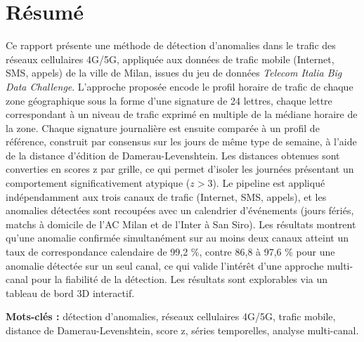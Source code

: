 \chapter*{Résumé}

Ce rapport présente une méthode de détection d'anomalies dans le trafic
des réseaux cellulaires 4G/5G, appliquée aux données de trafic mobile
(Internet, SMS, appels) de la ville de Milan, issues du jeu de données
\emph{Telecom Italia Big Data Challenge}. L'approche proposée encode le
profil horaire de trafic de chaque zone géographique sous la forme
d'une signature de 24 lettres, chaque lettre correspondant à un niveau
de trafic exprimé en multiple de la médiane horaire de la zone. Chaque
signature journalière est ensuite comparée à un profil de référence,
construit par consensus sur les jours de même type de semaine, à
l'aide de la distance d'édition de Damerau-Levenshtein. Les distances
obtenues sont converties en scores z par grille, ce qui permet
d'isoler les journées présentant un comportement significativement
atypique ($z > 3$). Le pipeline est appliqué indépendamment aux trois
canaux de trafic (Internet, SMS, appels), et les anomalies détectées
sont recoupées avec un calendrier d'événements (jours fériés, matchs à
domicile de l'AC Milan et de l'Inter à San Siro). Les résultats
montrent qu'une anomalie confirmée simultanément sur au moins deux
canaux atteint un taux de correspondance calendaire de 99,2 \%, contre
86,8 à 97,6 \% pour une anomalie détectée sur un seul canal, ce qui valide
l'intérêt d'une approche multi-canal pour la fiabilité de la
détection. Les résultats sont explorables via un tableau de bord 3D
interactif.

\vspace{4mm}
\noindent\textbf{Mots-clés :} détection d'anomalies, réseaux cellulaires
4G/5G, trafic mobile, distance de Damerau-Levenshtein, score z, séries
temporelles, analyse multi-canal.
